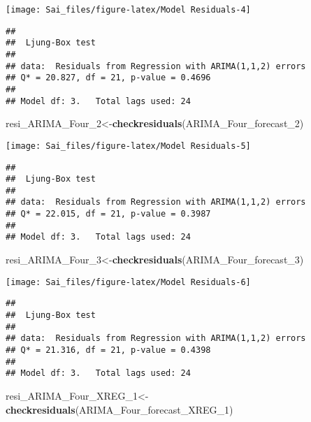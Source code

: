 \documentclass[
]{article}
\newenvironment{Shaded}{\begin{snugshade}}{\end{snugshade}}
\newcommand{\FunctionTok}[1]{\textcolor[rgb]{0.13,0.29,0.53}{\textbf{#1}}}
\newcommand{\NormalTok}[1]{#1}
\newcommand{\OtherTok}[1]{\textcolor[rgb]{0.56,0.35,0.01}{#1}}
\begin{document}
\begin{center}\texttt{[image: Sai\_files/figure-latex/Model Residuals-4]} \end{center}

\begin{verbatim}
## 
##  Ljung-Box test
## 
## data:  Residuals from Regression with ARIMA(1,1,2) errors
## Q* = 20.827, df = 21, p-value = 0.4696
## 
## Model df: 3.   Total lags used: 24
\end{verbatim}

\begin{Shaded}
\begin{Highlighting}[]
\NormalTok{resi\_ARIMA\_Four\_2}\OtherTok{\textless{}{-}}\FunctionTok{checkresiduals}\NormalTok{(ARIMA\_Four\_forecast\_2)}
\end{Highlighting}
\end{Shaded}

\begin{center}\texttt{[image: Sai\_files/figure-latex/Model Residuals-5]} \end{center}

\begin{verbatim}
## 
##  Ljung-Box test
## 
## data:  Residuals from Regression with ARIMA(1,1,2) errors
## Q* = 22.015, df = 21, p-value = 0.3987
## 
## Model df: 3.   Total lags used: 24
\end{verbatim}

\begin{Shaded}
\begin{Highlighting}[]
\NormalTok{resi\_ARIMA\_Four\_3}\OtherTok{\textless{}{-}}\FunctionTok{checkresiduals}\NormalTok{(ARIMA\_Four\_forecast\_3)}
\end{Highlighting}
\end{Shaded}

\begin{center}\texttt{[image: Sai\_files/figure-latex/Model Residuals-6]} \end{center}

\begin{verbatim}
## 
##  Ljung-Box test
## 
## data:  Residuals from Regression with ARIMA(1,1,2) errors
## Q* = 21.316, df = 21, p-value = 0.4398
## 
## Model df: 3.   Total lags used: 24
\end{verbatim}

\begin{Shaded}
\begin{Highlighting}[]
\NormalTok{resi\_ARIMA\_Four\_XREG\_1}\OtherTok{\textless{}{-}}\FunctionTok{checkresiduals}\NormalTok{(ARIMA\_Four\_forecast\_XREG\_1)}
\end{Highlighting}
\end{Shaded}
\end{document}

